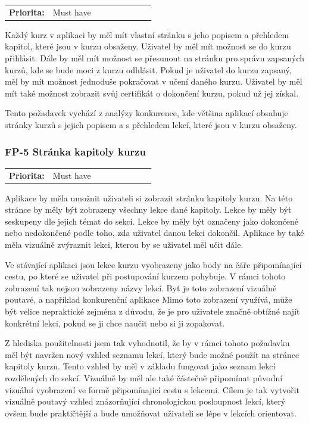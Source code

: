 \begin{tabular}{lp{0.7\linewidth}}
    \textbf{Priorita:} & Must have \\
\end{tabular}

Každý kurz v aplikaci by měl mít vlastní stránku s jeho popisem a přehledem kapitol, které jsou v kurzu obsaženy. Uživatel by měl mít možnost se do kurzu přihlásit. Dále by měl mít možnost se přesunout na stránku pro správu zapsaných kurzů, kde se bude moci z kurzu odhlásit. Pokud je uživatel do kurzu zapsaný, měl by mít možnost jednoduše pokračovat v učení daného kurzu. Uživatel by měl mít také možnost zobrazit svůj certifikát o dokončení kurzu, pokud už jej získal.

Tento požadavek vychází z analýzy konkurence, kde většina aplikací obsahuje stránky kurzů s jejich popisem a s přehledem lekcí, které jsou v kurzu obsaženy.

\subsubsection{FP-5 Stránka kapitoly kurzu}\label{sec:fp-course-chapter-page}

\begin{tabular}{lp{0.7\linewidth}}
    \textbf{Priorita:} & Must have \\
\end{tabular}

Aplikace by měla umožnit uživateli si zobrazit stránku kapitoly kurzu. Na této stránce by měly být zobrazeny všechny lekce dané kapitoly. Lekce by měly být seskupeny dle jejich témat do sekcí. Lekce by měly být označeny jako dokončené nebo nedokončené podle toho, zda uživatel danou lekci dokončil. Aplikace by také měla vizuálně zvýraznit lekci, kterou by se uživatel měl učit dále.

Ve stávající aplikaci jsou lekce kurzu vyobrazeny jako body na čáře připomínající cestu, po které se uživatel při postupování kurzem pohybuje. V rámci tohoto zobrazení tak nejsou zobrazeny názvy lekcí. Byť je toto zobrazení vizuálně poutavé, a například konkurenční aplikace Mimo toto zobrazení využívá, může být velice nepraktické zejména z důvodu, že je pro uživatele značně obtížné najít konkrétní lekci, pokud se ji chce naučit nebo si ji zopakovat.

Z hlediska použitelnosti jsem tak vyhodnotil, že by v rámci tohoto požadavku měl být navržen nový vzhled seznamu lekcí, který bude možné použít na stránce kapitoly kurzu. Tento vzhled by měl v základu fungovat jako seznam lekcí rozdělených do sekcí. Vizuálně by měl ale také částečně připomínat původní vizuální vyobrazení ve formě připomínající cestu s lekcemi. Cílem je tak vytvořit vizuálně poutavý vzhled znázorňující chronologickou posloupnost lekcí, který ovšem bude praktičtější a bude umožňovat uživateli se lépe v lekcích orientovat.

